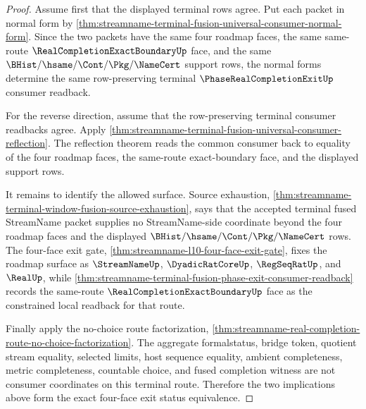 \begin{proof}
Assume first that the displayed terminal rows agree. Put each packet in normal
form by
\autoref{thm:streamname-terminal-fusion-universal-consumer-normal-form}. Since
the two packets have the same four roadmap faces, the same same-route
$\RealCompletionExactBoundaryUp$ face, and the same
$\BHist/\hsame/\Cont/\Pkg/\NameCert$ support rows, the normal forms determine
the same row-preserving terminal $\PhaseRealCompletionExitUp$ consumer readback.

For the reverse direction, assume that the row-preserving terminal consumer
readbacks agree. Apply
\autoref{thm:streamname-terminal-fusion-universal-consumer-reflection}. The
reflection theorem reads the common consumer back to equality of the four
roadmap faces, the same-route exact-boundary face, and the displayed support
rows.

It remains to identify the allowed surface. Source exhaustion,
\autoref{thm:streamname-terminal-window-fusion-source-exhaustion}, says that
the accepted terminal fused StreamName packet supplies no StreamName-side
coordinate beyond the four roadmap faces and the displayed
$\BHist/\hsame/\Cont/\Pkg/\NameCert$ rows. The four-face exit gate,
\autoref{thm:streamname-l10-four-face-exit-gate}, fixes the roadmap surface as
$\StreamNameUp$, $\DyadicRatCoreUp$, $\RegSeqRatUp$, and $\RealUp$, while
\autoref{thm:streamname-terminal-fusion-phase-exit-consumer-readback} records
the same-route $\RealCompletionExactBoundaryUp$ face as the constrained local
readback for that route.

Finally apply the no-choice route factorization,
\autoref{thm:streamname-real-completion-route-no-choice-factorization}. The
aggregate formalstatus, bridge token, quotient stream equality, selected
limits, host sequence equality, ambient completeness, metric completeness,
countable choice, and fused completion witness are not consumer coordinates on
this terminal route. Therefore the two implications above form the exact
four-face exit status equivalence.
\end{proof}

